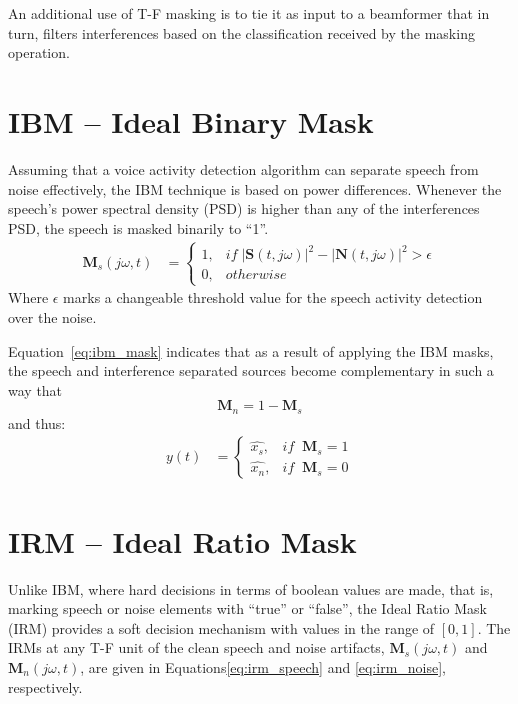 An additional use of T-F masking 
is to tie it as input to a beamformer that
in turn, filters interferences based 
on the classification received 
by the masking operation.

\section{IBM -- Ideal Binary Mask}
Assuming that a voice activity detection algorithm
can separate speech from noise effectively,
the IBM technique is based on power differences.
Whenever the speech's power 
spectral density (PSD) is higher 
than any of the interferences PSD, 
the speech is masked binarily to ``1''.
\begin{align}\label{eq:ibm_mask}
    \mathbf{M}_{s}(j\omega, t) & = 
        \begin{cases}
            1, & if\;|\mathbf{S}(t,j\omega)|^2 - |\mathbf{N}(t,j\omega)|^2 > \epsilon \\
            0, & otherwise
        \end{cases}
\end{align}
Where \(\epsilon\) marks a changeable threshold value 
for the speech activity detection over the noise.

Equation~\ref{eq:ibm_mask} indicates that as a result of 
applying the IBM masks, the speech and interference separated
sources become complementary in such a way that
\[\mathbf{M}_{n} = 1 - \mathbf{M}_{s} \] and thus:
\begin{align}
    y(t) &= \begin{cases}
        \hat{x_{s}}, &if\;\;\mathbf{M}_{s} = 1 \\
        \hat{x_{n}}, &if\;\;\mathbf{M}_{s} = 0
    \end{cases}
\end{align}

\section{IRM -- Ideal Ratio Mask}
Unlike IBM, where hard decisions in terms of 
boolean values are made,
that is, marking speech or noise 
elements with ``true'' or ``false'', the Ideal Ratio Mask (IRM) provides a soft decision
mechanism with values in the range of \([0,1]\)\cite{Jiang2018RobustBF}.
The IRMs at any T-F unit of the clean speech and noise artifacts,
\(\mathbf{M}_{s}(j\omega, t)\) and \(\mathbf{M}_{n}(j\omega, t)\),
are given in 
Equations\;\ref{eq:irm_speech} and \ref{eq:irm_noise}, respectively.

